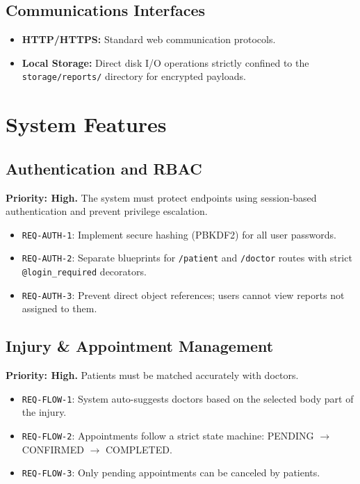 \documentclass[11pt,a4paper]{article}
\begin{document}
\subsection{Communications Interfaces}
\begin{itemize}
    \item \textbf{HTTP/HTTPS:} Standard web communication protocols.
    \item \textbf{Local Storage:} Direct disk I/O operations strictly confined to the \texttt{storage/reports/} directory for encrypted payloads.
\end{itemize}

\section{System Features}

\subsection{Authentication and RBAC}
\textbf{Priority: High.} The system must protect endpoints using session-based authentication and prevent privilege escalation.
\begin{itemize}[label=--]
    \item \texttt{REQ-AUTH-1}: Implement secure hashing (PBKDF2) for all user passwords.
    \item \texttt{REQ-AUTH-2}: Separate blueprints for \texttt{/patient} and \texttt{/doctor} routes with strict \texttt{@login\_required} decorators.
    \item \texttt{REQ-AUTH-3}: Prevent direct object references; users cannot view reports not assigned to them.
\end{itemize}

\subsection{Injury \& Appointment Management}
\textbf{Priority: High.} Patients must be matched accurately with doctors.
\begin{itemize}[label=--]
    \item \texttt{REQ-FLOW-1}: System auto-suggests doctors based on the selected body part of the injury.
    \item \texttt{REQ-FLOW-2}: Appointments follow a strict state machine: PENDING $\rightarrow$ CONFIRMED $\rightarrow$ COMPLETED.
    \item \texttt{REQ-FLOW-3}: Only pending appointments can be canceled by patients.
\end{itemize}
\end{document}
